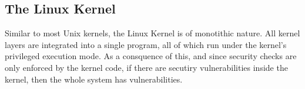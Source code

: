 




\subsection{The Linux Kernel}



Similar to most Unix kernels, the Linux Kernel is of monotithic nature. All kernel layers
are integrated into a single program, all of which run under the kernel's privileged execution
mode. As a consquence of this, and since security checks are only enforced by the kernel code,
if there are secutiry vulnerabilities inside the kernel, then the whole system has vulnerabilities\cite{korbethLinuxDeviceDrivers2005}.


